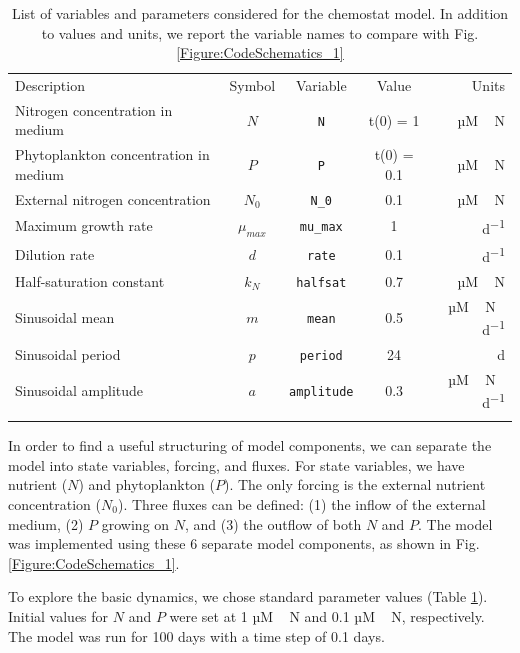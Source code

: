 \documentclass[journal abbreviation, manuscript]{copernicus}
\begin{document}
%
\begin{table}[t]
\caption{List of variables and parameters considered for the chemostat model. In addition to values and units, we report the variable names to compare with Fig. \ref{Figure:CodeSchematics_1}}
\begin{tabular}{l c c c r}
\tophline
Description & Symbol & Variable & Value & Units \\
\middlehline

Nitrogen concentration in medium & $N$ & \texttt{N} & t(0) = 1 & \unit{µM\,N} \\
Phytoplankton concentration in medium & $P$ & \texttt{P} & t(0) = 0.1 & \unit{µM\,N} \\
External nitrogen concentration & $N_0$ & \texttt{N\_0} & 0.1 & \unit{µM\,N} \\
Maximum growth rate & $\mu_{max}$ & \texttt{mu\_max} & 1 & \unit{d^{-1}} \\
Dilution rate & $d$ & \texttt{rate} & 0.1 & \unit{d^{-1}}\\
Half-saturation constant &  $k_N$ & \texttt{halfsat} & 0.7 & \unit{µM\,N}\\

Sinusoidal mean &  $m$ & \texttt{mean} & 0.5 & \unit{µM\,N\,d^{-1}}\\
Sinusoidal period &  $p$ & \texttt{period} & 24 & \unit{d}\\
Sinusoidal amplitude &  $a$ & \texttt{amplitude} & 0.3 & \unit{µM\,N\,d^{-1}}\\

\bottomhline
\end{tabular}
\label{Table:UseCase1Parameters}
\end{table}
%

In order to find a useful structuring of model components, we can separate the model into state variables, forcing, and fluxes. For state variables, we have nutrient ($N$) and phytoplankton ($P$). The only forcing is the external nutrient concentration ($N_0$). Three fluxes can be defined: (1) the inflow of the external medium, (2) $P$ growing on $N$, and (3) the outflow of both $N$ and $P$. The model was implemented using these 6 separate model components, as shown in Fig. \ref{Figure:CodeSchematics_1}.

To explore the basic dynamics, we chose standard parameter values (Table \ref{Table:UseCase1Parameters}). Initial values for $N$ and $P$ were set at 1 \unit{µM\,N} and 0.1 \unit{µM\,N}, respectively. The model was run for 100 days with a time step of 0.1 days.
\end{document}

